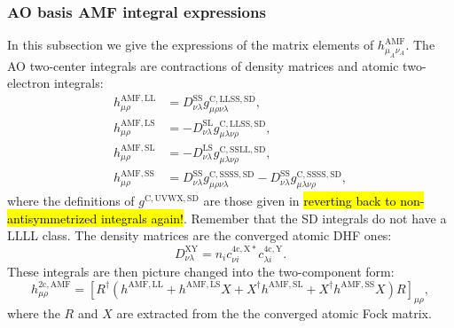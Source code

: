 \documentclass{article}
\begin{document}
\subsubsection{AO basis AMF integral expressions}
In this subsection we give the expressions of the matrix elements of $h_{\mu_A\nu_A}^{\mathrm{AMF}}$.
The AO two-center integrals are contractions of density matrices and atomic two-electron integrals:
\begin{align}
h_{\mu\rho}^{\mathrm{AMF, LL}}&=D_{\nu\lambda}^{\mathrm{SS}}g^{\mathrm{C, LLSS, SD}}_{\mu\rho\nu\lambda},\\
h_{\mu\rho}^{\mathrm{AMF, LS}}&=-D_{\nu\lambda}^{\mathrm{SL}}g^{\mathrm{C, LLSS, SD}}_{\mu\lambda\nu\rho},\\
h_{\mu\rho}^{\mathrm{AMF, SL}}&=-D_{\nu\lambda}^{\mathrm{LS}}g^{\mathrm{C, SSLL, SD}}_{\mu\lambda\nu\rho},\\
h_{\mu\rho}^{\mathrm{AMF, SS}}&=D_{\nu\lambda}^{\mathrm{SS}}g^{\mathrm{C, SSSS, SD}}_{\mu\rho\nu\lambda}-D_{\nu\lambda}^{\mathrm{SS}}g^{\mathrm{C, SSSS, SD}}_{\mu\lambda\nu\rho},
\end{align}
where the definitions of $g^{\mathrm{C, UVWX, SD}}$ are those given in \hl{reverting back to non-antisymmetrized integrals again!}. Remember that the SD integrals do not have a LLLL class. The density matrices are the converged atomic DHF ones:
\begin{equation}
    D_{\nu\lambda}^{\mathrm{XY}}=n_ic_{\nu i}^{\mathrm{4c,X}*}c^{\mathrm{4c,Y}}_{\lambda i}.
\end{equation}
These integrals are then picture changed into the two-component form:
\begin{equation}
    h^{\mathrm{2c,AMF}}_{\mu\rho}=[R^{\dagger}(h^{\mathrm{AMF,LL}}+h^{\mathrm{AMF,LS}}X+X^{\dagger}h^{\mathrm{AMF,SL}}+X^{\dagger}h^{\mathrm{AMF,SS}}X)R]_{\mu\rho},
\end{equation}
where the $R$ and $X$ are extracted from the the converged atomic Fock matrix.
\end{document}
